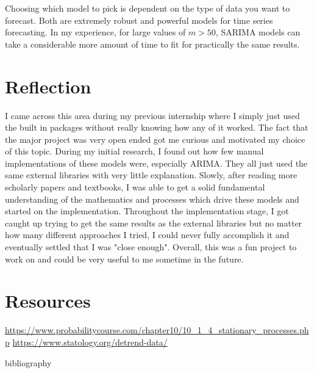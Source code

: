 \documentclass{article}
\begin{document}
  Choosing which model to pick is dependent on the type of data you want to forecast. Both are extremely robust and powerful models for time series forecasting. In my experience, for large values of $m>50$, SARIMA models can take a considerable more amount of time to fit for practically the same results.

  \section{Reflection}
  I came across this area during my previous internship where I simply just used the built in packages without really knowing how any of it worked. The fact that the major project was very open ended got me curious and motivated my choice of this topic. During my initial research, I found out how few manual implementations of these models were, especially ARIMA. They all just used the same external libraries with very little explanation. Slowly, after reading more scholarly papers and textbooks, I was able to get a solid fundamental understanding of the mathematics and processes which drive these models and started on the implementation. Throughout the implementation stage, I got caught up trying to get the same results as the external libraries but no matter how many different approaches I tried, I could never fully accomplish it and eventually settled that I was "close enough". Overall, this was a fun project to work on and could be very useful to me sometime in the future.

  \section{Resources}
  \url{https://www.probabilitycourse.com/chapter10/10_1_4_stationary_processes.php}
  \url{https://www.statology.org/detrend-data/}

  bibliography\cite{articleFactCheck}
  \printbibliography
\end{document}
